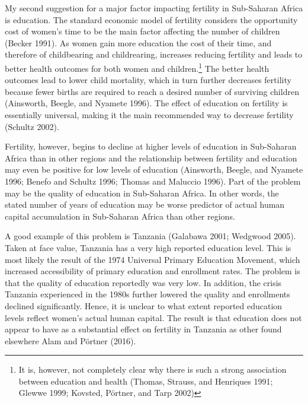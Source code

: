 \documentclass[]{article}
\begin{document}
My second suggestion for a major factor impacting fertility in Sub-Saharan Africa is education. The standard economic model of fertility considers the opportunity cost of women's time to be the main factor affecting the number of children (Becker 1991). As women gain more education the cost of their time, and therefore of childbearing and childrearing, increases reducing fertility and leads to better health outcomes for both women and children.\footnote{It is, however, not completely clear why there is such a strong association between education and health (Thomas, Strauss, and Henriques 1991; Glewwe 1999; Kovsted, Pörtner, and Tarp 2002)} The better health outcomes lead to lower child mortality, which in turn further decreases fertility because fewer births are required to reach a desired number of surviving children (Ainsworth, Beegle, and Nyamete 1996). The effect of education on fertility is essentially universal, making it the main recommended way to decrease fertility (Schultz 2002).

Fertility, however, begins to decline at higher levels of education in Sub-Saharan Africa than in other regions and the relationship between fertility and education may even be positive for low levels of education (Ainsworth, Beegle, and Nyamete 1996; Benefo and Schultz 1996; Thomas and Maluccio 1996). Part of the problem may be the quality of education in Sub-Saharan Africa. In other words, the stated number of years of education may be worse predictor of actual human capital accumulation in Sub-Saharan Africa than other regions.

A good example of this problem is Tanzania (Galabawa 2001; Wedgwood 2005). Taken at face value, Tanzania has a very high reported education level. This is most likely the result of the 1974 Universal Primary Education Movement, which increased accessibility of primary education and enrollment rates. The problem is that the quality of education reportedly was very low. In addition, the crisis Tanzania experienced in the 1980s further lowered the quality and enrollments declined significantly. Hence, it is unclear to what extent reported education levels reflect women's actual human capital. The result is that education does not appear to have as a substantial effect on fertility in Tanzania as other found elsewhere Alam and Pörtner (2016).
\end{document}
